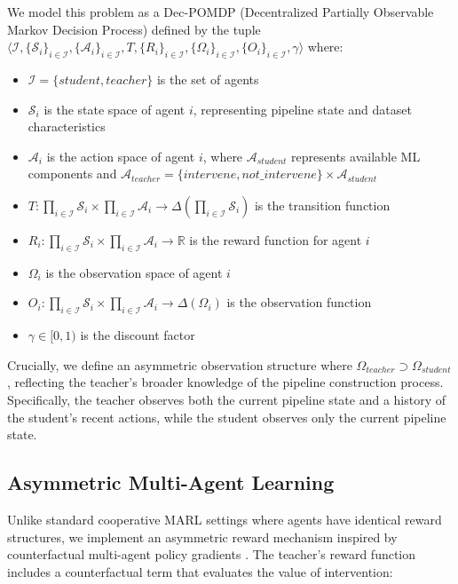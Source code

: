 \documentclass[twoside,11pt]{article}
\newcommand{\R}{\mathbb{R}}
\newcommand{\action}{\mathcal{A}}
\newcommand{\state}{\mathcal{S}}
\begin{document}
We model this problem as a Dec-POMDP (Decentralized Partially Observable Markov Decision Process) defined by the tuple $\langle \mathcal{I}, \{\state_i\}_{i \in \mathcal{I}}, \{\action_i\}_{i \in \mathcal{I}}, T, \{R_i\}_{i \in \mathcal{I}}, \{\Omega_i\}_{i \in \mathcal{I}}, \{O_i\}_{i \in \mathcal{I}}, \gamma \rangle$ where:

\begin{itemize}
    \item $\mathcal{I} = \{student, teacher\}$ is the set of agents
    \item $\state_i$ is the state space of agent $i$, representing pipeline state and dataset characteristics
    \item $\action_i$ is the action space of agent $i$, where $\action_{student}$ represents available ML components and $\action_{teacher} = \{intervene, not\_intervene\} \times \action_{student}$
    \item $T: \prod_{i \in \mathcal{I}} \state_i \times \prod_{i \in \mathcal{I}} \action_i \rightarrow \Delta(\prod_{i \in \mathcal{I}} \state_i)$ is the transition function
    \item $R_i: \prod_{i \in \mathcal{I}} \state_i \times \prod_{i \in \mathcal{I}} \action_i \rightarrow \R$ is the reward function for agent $i$
    \item $\Omega_i$ is the observation space of agent $i$
    \item $O_i: \prod_{i \in \mathcal{I}} \state_i \times \prod_{i \in \mathcal{I}} \action_i \rightarrow \Delta(\Omega_i)$ is the observation function
    \item $\gamma \in [0, 1)$ is the discount factor
\end{itemize}

Crucially, we define an asymmetric observation structure where $\Omega_{teacher} \supset \Omega_{student}$, reflecting the teacher's broader knowledge of the pipeline construction process. Specifically, the teacher observes both the current pipeline state and a history of the student's recent actions, while the student observes only the current pipeline state.

\subsection{Asymmetric Multi-Agent Learning}

Unlike standard cooperative MARL settings where agents have identical reward structures, we implement an asymmetric reward mechanism inspired by counterfactual multi-agent policy gradients \citep{foerster2018counterfactual}. The teacher's reward function includes a counterfactual term that evaluates the value of intervention:
\end{document}
